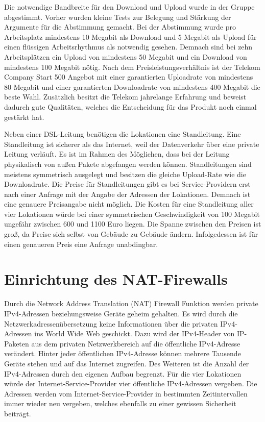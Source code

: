 \documentclass[fontsize=12pt,paper=a4,open=any,parskip=half,
  twoside=false,toc=listof,toc=bibliography,fleqn,leqno,
  captions=nooneline,captions=tableabove,british]{scrbook}
\begin{document}
Die notwendige Bandbreite für den Download und Upload wurde in der Gruppe abgestimmt. Vorher wurden kleine Tests zur Belegung und Stärkung der Argumente für die Abstimmung gemacht. Bei der Abstimmung wurde pro Arbeitsplatz mindestens 10 Megabit als Download und 5 Megabit als Upload für einen flüssigen Arbeitsrhythmus als notwendig gesehen. Demnach sind bei zehn Arbeitsplätzen ein Upload von mindestens 50 Megabit und ein Download von mindestens 100 Megabit nötig. Nach dem Preisleistungsverhältnis ist der Telekom Company Start 500 Angebot mit einer garantierten Uploadrate von mindestens 80 Megabit und einer garantierten Downloadrate von mindestens 400 Megabit die beste Wahl. Zusätzlich besitzt die Telekom jahrelange Erfahrung und beweist dadurch gute Qualitäten, welches die Entscheidung für das Produkt noch einmal gestärkt hat.\par
Neben einer DSL-Leitung benötigen die Lokationen eine Standleitung. Eine Standleitung ist sicherer als das Internet, weil der Datenverkehr über eine private Leitung verläuft. Es ist im Rahmen des Möglichen, dass bei der Leitung physikalisch von außen Pakete abgefangen werden können. Standleitungen sind meistens symmetrisch ausgelegt und besitzen die gleiche Upload-Rate wie die Downloadrate. Die Preise für Standleitungen gibt es bei Service-Providern erst nach einer Anfrage mit der Angabe der Adressen der Lokationen. Demnach ist eine genauere Preisangabe nicht möglich. Die Kosten für eine Standleitung aller vier Lokationen würde bei einer symmetrischen Geschwindigkeit von 100 Megabit ungefähr zwischen 600 und 1100 Euro liegen. Die Spanne zwischen den Preisen ist groß, da Preise sich selbst von Gebäude zu Gebäude ändern. Infolgedessen ist für einen genaueren Preis eine Anfrage unabdingbar.


\section{Einrichtung des NAT-Firewalls}
Durch die Network Address Translation (NAT) Firewall Funktion werden private IPv4-Adressen beziehungsweise Geräte geheim gehalten. Es wird durch die Netzwerkadressenübersetzung keine Informationen über die privaten IPv4-Adressen ins World Wide Web geschickt. Dazu wird der IPv4-Header von IP-Paketen aus dem privaten Netzwerkbereich auf die öffentliche IPv4-Adresse verändert. Hinter jeder öffentlichen IPv4-Adresse können mehrere Tausende Geräte stehen und auf das Internet zugreifen. Des Weiteren ist die Anzahl der IPv4-Adressen durch den eigenen Aufbau begrenzt. Für die vier Lokationen würde der Internet-Service-Provider vier öffentliche IPv4-Adressen vergeben. Die Adressen werden vom Internet-Service-Provider in bestimmten Zeitintervallen immer wieder neu vergeben, welches ebenfalls zu einer gewissen Sicherheit beiträgt.
\end{document}
